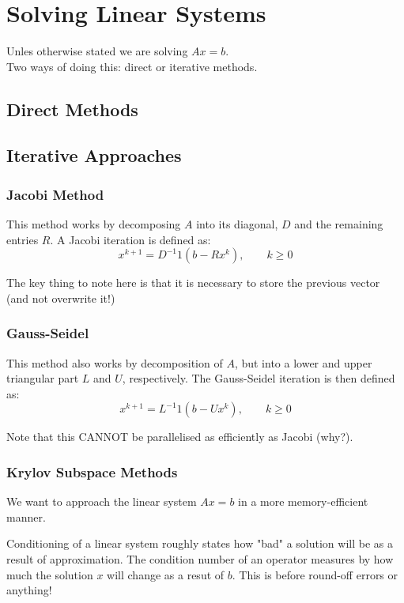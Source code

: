 \section{Solving Linear Systems}

Unles otherwise stated we are solving $Ax=b$.\\

Two ways of doing this: direct or iterative methods.

\subsection{Direct Methods}

\subsection{Iterative Approaches}
\subsubsection{Jacobi Method}

This method works by decomposing $A$ into its diagonal, $D$ and the
remaining entries $R$. A Jacobi iteration is defined as:
\[
x^{k+1} = D^{-1}1 (b  - R x^k), \qquad k\geq 0
\]

The key thing to note here is that it is necessary to store the previous
vector (and not overwrite it!)

\subsubsection{Gauss-Seidel}

This method also works by decomposition of $A$, but into a lower and upper
triangular part $L$ and $U$, respectively. The Gauss-Seidel iteration is
then defined as:
\[
x^{k+1} = L^{-1}1 (b  - U x^k), \qquad k\geq 0
\]

Note that this CANNOT be parallelised as efficiently as Jacobi (why?).

\subsubsection{Krylov Subspace Methods}

We want to approach the linear system $Ax=b$ in a more memory-efficient manner.

Conditioning of a linear system roughly states how "bad" a solution will be as a result of approximation.
The condition number of an operator measures by how much the solution $x$ will change as a resut of $b$.
This is before round-off errors or anything!\\


